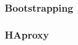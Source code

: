 \begin{flushleft}
    \subsubsection{Bootstrapping}
\end{flushleft}
\begin{flushleft}
    \subsubsection{HAproxy}
\end{flushleft}
\begin{flushleft}
\end{flushleft}